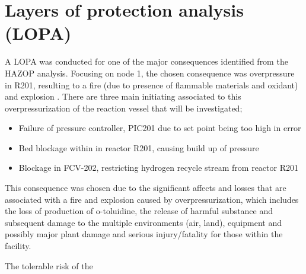 \section{Layers of protection analysis (LOPA)}

A LOPA was conducted for one of the major consequences identified from the HAZOP analysis. Focusing on node 1, the chosen consequence was overpressure in R201, resulting to a fire (due to presence of flammable materials and oxidant) and explosion . There are three main initiating associated to this overpressurization of the reaction vessel that will be investigated;

\begin{itemize}
\item Failure of pressure controller, PIC201 due to set point being too high in error
\item Bed blockage within in reactor R201, causing build up of pressure
\item Blockage in FCV-202, restricting hydrogen recycle stream from reactor R201

\end{itemize}
This consequence was chosen due to the significant affects and losses that are associated with a fire and explosion caused by overpressurization, which includes the loss of production of o-toluidine, the release of harmful substance and subsequent damage to the multiple environments (air, land), equipment and possibly major plant damage and serious injury/fatality for those within the facility. 

The tolerable risk of the     

 